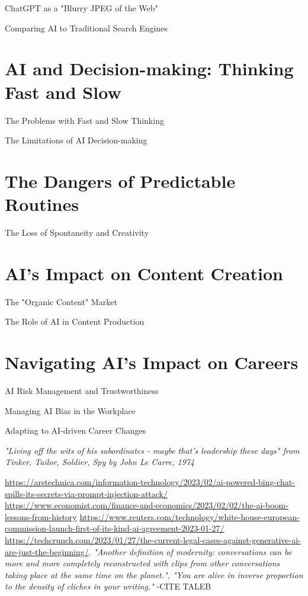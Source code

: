 ChatGPT as a "Blurry JPEG of the Web"

Comparing AI to Traditional Search Engines

\section{AI and Decision-making: Thinking Fast and Slow}
The Problems with Fast and Slow Thinking

The Limitations of AI Decision-making

\section{The Dangers of Predictable Routines}
The Loss of Spontaneity and Creativity

\section{AI's Impact on Content Creation}
The "Organic Content" Market

The Role of AI in Content Production

\section{Navigating AI's Impact on Careers}
AI Risk Management and Trustworthiness

Managing AI Bias in the Workplace

Adapting to AI-driven Career Changes


\textit{"Living off the wits of his subordinates - maybe that's leadership these days" from Tinker, Tailor, Soldier, Spy by John Le Carre, 1974}\cite{Lecarre}

\url{https://arstechnica.com/information-technology/2023/02/ai-powered-bing-chat-spills-its-secrets-via-prompt-injection-attack/}
\cite{KrohnTED}
\url{https://www.economist.com/finance-and-economics/2023/02/02/the-ai-boom-lessons-from-history} 
\url{https://www.reuters.com/technology/white-house-european-commission-launch-first-of-its-kind-ai-agreement-2023-01-27/}
\url{https://techcrunch.com/2023/01/27/the-current-legal-cases-against-generative-ai-are-just-the-beginning/}.
\textit{"Another definition of modernity: conversations can be more and more completely reconstructed with clips from other conversations taking place at the same time on the planet.", "You are alive in inverse proportion to the density of cliches in your writing."} -CITE TALEB

